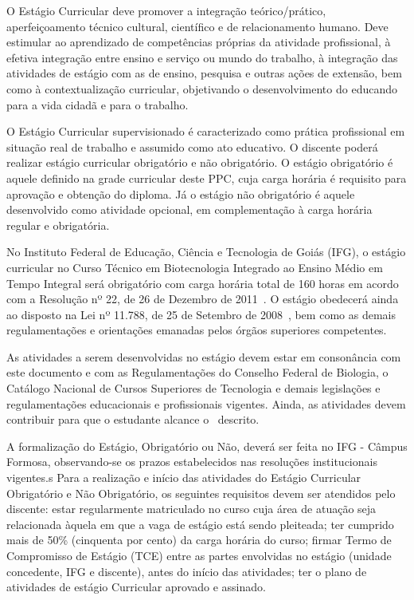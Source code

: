 \documentclass[11pt,fleqn]{book} %
\begin{document}
O Estágio Curricular deve promover a integração teórico/prático, aperfeiçoamento técnico cultural, científico e de relacionamento humano.  
Deve estimular ao aprendizado de competências próprias da atividade profissional, à efetiva integração entre ensino e serviço ou mundo do trabalho, à integração das atividades de estágio com as de ensino, pesquisa e outras ações de extensão, bem como à contextualização curricular, objetivando o desenvolvimento do educando para a vida cidadã e para o trabalho.

O Estágio Curricular supervisionado é caracterizado como prática profissional em situação real de trabalho e assumido como ato educativo. 
O discente poderá realizar estágio curricular obrigatório e não obrigatório. 
O estágio obrigatório é aquele definido na grade curricular deste PPC, cuja carga horária é requisito para aprovação e obtenção do diploma. 
Já o estágio não obrigatório é aquele desenvolvido como atividade opcional, em complementação à carga horária regular e obrigatória.

No Instituto Federal de Educação, Ciência e Tecnologia de Goiás (IFG), o estágio curricular no Curso Técnico em Biotecnologia Integrado ao Ensino Médio em Tempo Integral será obrigatório com carga horária total de 160 horas em acordo com a Resolução nº 22, de 26 de Dezembro de 2011~\cite{Resolucao22De2011}.
O estágio obedecerá ainda ao disposto na Lei nº 11.788, de 25 de Setembro de 2008~\cite{Lei11788De2008}, bem como as demais regulamentações e orientações emanadas pelos órgãos superiores competentes. 

As atividades a serem desenvolvidas no estágio devem estar em consonância com este documento e com as Regulamentações do Conselho Federal de Biologia, o Catálogo Nacional de Cursos Superiores de Tecnologia e demais legislações e regulamentações educacionais e profissionais vigentes.
Ainda, as atividades devem contribuir para que o estudante alcance o~ descrito.

A formalização do Estágio, Obrigatório ou Não, deverá ser feita no IFG - Câmpus Formosa, observando-se os prazos estabelecidos nas resoluções institucionais vigentes.s
Para a realização e início das atividades do Estágio Curricular Obrigatório e Não Obrigatório, os seguintes requisitos devem ser atendidos pelo discente: estar regularmente matriculado no curso cuja área de atuação seja relacionada àquela em que a vaga de estágio está sendo pleiteada; ter cumprido mais de 50\% (cinquenta por cento) da carga horária do curso; firmar Termo de Compromisso de Estágio (TCE) entre as partes envolvidas no estágio (unidade concedente, IFG e discente), antes do início das atividades; ter o plano de atividades de estágio Curricular aprovado e assinado.
\end{document}
